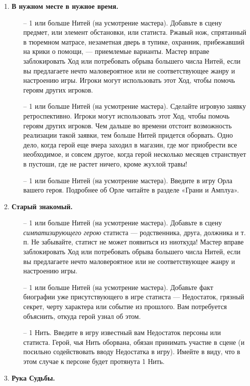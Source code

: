 \begin{enumerate}
\item \textbf{В нужном месте в нужное время.}
\begin{itemize}
\item[--] 1 или больше Нитей (на усмотрение мастера). Добавьте в сцену предмет, или элемент обстановки, или статиста. Ржавый нож, спрятанный в тюремном матрасе, незаметная дверь в тупике, охранник, прибежавший на крики о помощи, — приемлемые варианты. Мастер вправе заблокировать Ход или потребовать обрыва большего числа Нитей, если вы предлагаете нечто маловероятное или не соответствующее жанру и настроению игры. Игроки могут использовать этот Ход, чтобы помочь героям других игроков.
\item[--] 1 или больше Нитей (на усмотрение мастера). Сделайте игровую заявку ретроспективно. Игроки могут использовать этот Ход, чтобы помочь героям других игроков. Чем дальше во времени отстоит возможность реализации такой заявки, тем больше Нитей придется оборвать. Одно дело, когда герой еще вчера заходил в магазин, где мог приобрести все необходимое, и совсем другое, когда герой несколько месяцев странствует в пустоши, где не растет ничего, кроме жухлой травы!
\item[--] 1 или больше Нитей (на усмотрение мастера). Введите в игру Орла вашего героя. Подробнее об Орле читайте в разделе «Грани и Амплуа».
\end{itemize}
\item \textbf{Старый знакомый.}
\begin{itemize}
\item[--] 1 или больше Нитей (на усмотрение мастера). Добавьте в сцену \textit{симпатизирующего герою} статиста — родственника, друга, должника и т. п. Не забывайте, статист не может появиться из ниоткуда! Мастер вправе заблокировать Ход или потребовать обрыва большего числа Нитей, если вы предлагаете нечто маловероятное или не соответствующее жанру и настроению игры.
\item[--] 1 или больше Нитей (на усмотрение мастера). Добавьте факт биографии уже присутствующего в игре статиста — Недостаток, грязный секрет, черту характера или событие из прошлого. Вам потребуется объяснить, откуда герой узнал об этом.
\item[--] 1 Нить. Введите в игру известный вам Недостаток персоны или статиста. Герой, чья Нить оборвана, обязан принимать участие в сцене (и посильно содействовать вводу Недостатка в игру). Имейте в виду, что в этом случае к персоне будет протянута 1 Нить.
\end{itemize}
\item \textbf{Рука Судьбы.}

\end{enumerate}
